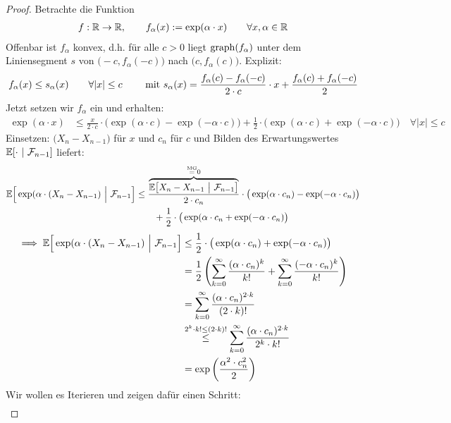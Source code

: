 \begin{proof}
	Betrachte die Funktion
	\begin{align*}
		f:\R\to\R,\qquad f_\alpha(x):=\exp(\alpha\cdot x)\qquad\forall x,\alpha\in\R
	\end{align*}
	Offenbar ist $f_\alpha$ konvex, d.h. für alle $c>0$ liegt $\graph(f_\alpha)$ unter dem Liniensegment $s$ von $\big(-c,f_\alpha(-c)\big)$ nach $\big(c,f_\alpha(c)\big)$. Explizit:
	\begin{align*}
		f_\alpha(x)\leq s_\alpha(x)\qquad\forall |x|\leq c\qquad\mit s_\alpha(x)=\frac{f_\alpha(c)-f_\alpha(-c)}{2\cdot c}\cdot x+\frac{f_\alpha(c)+f_\alpha(-c)}{2}
	\end{align*}
	Jetzt setzen wir $f_\alpha$ ein und erhalten:
	\begin{align*}
		\exp(\alpha\cdot x)
		&\leq\frac{x}{2\cdot c}\cdot\big(\exp(\alpha\cdot c)-\exp(-\alpha\cdot c)\big)+\frac{1}{2}\cdot\big(\exp(\alpha\cdot c)+\exp(-\alpha\cdot c)\big)\quad\forall |x|\leq c
	\end{align*}
	Einsetzen: $\big(X_n-X_{n-1}\big)$ für $x$ und $c_n$ für $c$ und Bilden des Erwartungswertes $\E[\cdot~|~\F_{n-1}]$ liefert:
	\begin{align*}
		\E\Big[\exp(\alpha\cdot(X_n-X_{n-1})~\Big|~\F_{n-1}\Big]
		&\leq
		\frac{\overbrace{\E\big[X_n-X_{n-1}~\big|~\F_{n-1}\big]}^{\stackeq{\text{MG}}0}}{2\cdot c_n}\cdot\big(\exp(\alpha\cdot c_n)-\exp(-\alpha\cdot c_n)\big)\\
		&\qquad+\frac{1}{2}\cdot\big(\exp(\alpha\cdot c_n+\exp(-\alpha\cdot c_n)\big)
	\end{align*}
	\begin{align*}
		\implies
		\E\Big[\exp(\alpha\cdot(X_n-X_{n-1})~\Big|~\F_{n-1}\Big]
		&\leq \frac{1}{2}\cdot\big(\exp(\alpha\cdot c_n)+\exp(-\alpha\cdot c_n)\big)\\
		&=\frac{1}{2}\left(\sum\limits_{k=0}^\infty\frac{(\alpha\cdot c_n)^{k}}{k!}+\sum\limits_{k=0}^\infty\frac{(-\alpha\cdot c_n)^{k}}{k!}\right)\\
		&=\sum\limits_{k=0}^\infty\frac{(\alpha\cdot c_n)^{2\cdot k}}{(2\cdot k)!}\\
		&\stackrel{2^k\cdot k! \leq (2\cdot k)!}{\leq}\sum\limits_{k=0}^\infty\frac{(\alpha\cdot c_n)^{2\cdot k}}{2^k\cdot k!}\\
		&=\exp\left(\frac{\alpha^2\cdot c_n^2}{2}\right)
	\end{align*}
	Wir wollen es Iterieren und zeigen dafür einen Schritt:
	\begin{align*}

\end{align*}
\end{proof}
